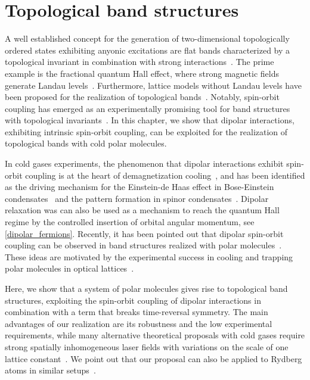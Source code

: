 \chapter{Topological band structures}
\label{topological_bands}

A well established concept for the generation of two-dimensional topologically ordered states exhibiting anyonic excitations are flat bands characterized by a topological invariant in combination with strong interactions~\cite{Bergholtz2013,Parameswaran2013}.
The prime example is the fractional quantum Hall effect, where strong magnetic fields generate Landau levels~\cite{Nayak2008}.
Furthermore, lattice models without Landau levels have been proposed for the realization of topological bands~\cite{Haldane1988,Raghu2008,Wang2011,Neupert2011,Wang2012a,Grushin2012,Moller2009,Sun2010,Barkeshli2012,Wang2011a,Sterdyniak2013,Liu2012,Yao2013,Yang2012,Dauphin2012,Cooper2012,Cooper2013,Shi2013}.
Notably, spin-orbit coupling has emerged as an experimentally promising tool for band structures with topological invariants~\cite{Kane2005,Pesin2009,Qi2011,Hasan2010,Tang2011,Qiao2011}.
In this chapter, we show that dipolar interactions, exhibiting intrinsic spin-orbit coupling, can be exploited for the realization of topological bands with cold polar molecules.

In cold gases experiments, the phenomenon that dipolar interactions exhibit spin-orbit coupling is at the heart of demagnetization cooling~\cite{Hensler2003,Fattori2006,Pasquiou2011,DePaz2013a},
and has been identified as the driving mechanism for the Einstein-de Haas effect in Bose-Einstein condensates~\cite{Kawaguchi2006} and the pattern formation in spinor condensates~\cite{Santos2006,Vengalattore2008,Kurn2013}.
Dipolar relaxation was can also be used as a mechanism to reach the quantum Hall regime by the controlled insertion of orbital angular momentum, see \cref{dipolar_fermions}.
Recently, it has been pointed out that dipolar spin-orbit coupling can be observed in band structures realized with polar molecules~\cite{Syzranov2014}.
These ideas are motivated by the experimental success in cooling and trapping polar molecules in optical lattices~\cite{Ni2008b,Yan2013}.

Here, we show that a system of polar molecules gives rise to topological band structures, exploiting the spin-orbit coupling of dipolar interactions in combination with a term that breaks time-reversal symmetry.
The main advantages of our realization are its robustness and the low experimental requirements, while many alternative theoretical proposals with cold gases require strong spatially inhomogeneous laser fields with variations on the scale of one lattice constant~\cite{Liu2010,Stanescu2010,Goldman2013,Li2008,Yao2012,Yao2013,Goldman2013,Jaksch2003}.
We point out that our proposal can also be applied to Rydberg atoms in similar setups~\cite{Barredo2014,Piotrowicz2013,Nogrette2014}.


